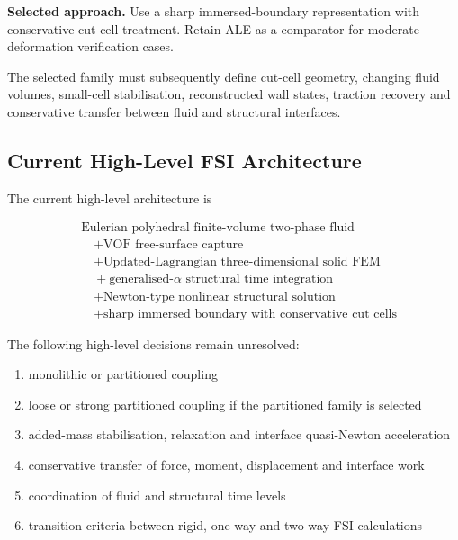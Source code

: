 \textbf{Selected approach.} Use a sharp immersed-boundary representation with conservative cut-cell treatment. Retain ALE as a comparator for moderate-deformation verification cases.

The selected family must subsequently define cut-cell geometry, changing fluid volumes, small-cell stabilisation, reconstructed wall states, traction recovery and conservative transfer between fluid and structural interfaces.

\subsection{Current High-Level FSI Architecture}
\label{subsec:res_str_fsi_current_architecture}

The current high-level architecture is

\begin{align}
&\text{Eulerian polyhedral finite-volume two-phase fluid}
\nonumber\\
&\quad+
\text{VOF free-surface capture}
\nonumber\\
&\quad+
\text{Updated-Lagrangian three-dimensional solid FEM}
\nonumber\\
&\quad+
\text{generalised-}\alpha\text{ structural time integration}
\nonumber\\
&\quad+
\text{Newton-type nonlinear structural solution}
\nonumber\\
&\quad+
\text{sharp immersed boundary with conservative cut cells}
\label{eq:res_str_fsi_current_architecture}
\end{align}

The following high-level decisions remain unresolved:

\begin{enumerate}
    \item monolithic or partitioned coupling
    \item loose or strong partitioned coupling if the partitioned family is selected
    \item added-mass stabilisation, relaxation and interface quasi-Newton acceleration
    \item conservative transfer of force, moment, displacement and interface work
    \item coordination of fluid and structural time levels
    \item transition criteria between rigid, one-way and two-way FSI calculations
\end{enumerate}


